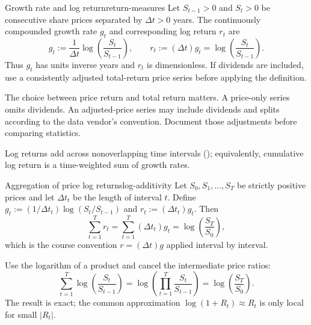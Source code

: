 \documentclass[11pt]{article}
\begin{document}
\begin{definition}{Growth rate and log return}{return-measures}
Let $S_{t-1}>0$ and $S_t>0$ be consecutive share prices separated by $\Delta t>0$ years. The continuously compounded growth rate $g_t$ and corresponding log return $r_t$ are
\begin{equation}
  \label{eq:return-measures}
  g_t:=\frac{1}{\Delta t}\log\!\left(\frac{S_t}{S_{t-1}}\right),
  \qquad
  r_t:=(\Delta t)g_t=\log\!\left(\frac{S_t}{S_{t-1}}\right).
\end{equation}
Thus $g_t$ has units inverse years and $r_t$ is dimensionless. If dividends are included, use a consistently adjusted total-return price series before applying the definition.
\end{definition}

The choice between price return and total return matters. A price-only series omits dividends. An adjusted-price series may include dividends and splits according to the data vendor's convention. Document those adjustments before comparing statistics.

Log returns add across nonoverlapping time intervals (); equivalently, cumulative log return is a time-weighted sum of growth rates.

\begin{proposition}{Aggregation of price log returns}{log-additivity}
Let $S_0,S_1,\ldots,S_T$ be strictly positive prices and let $\Delta t_t$ be the length of interval $t$. Define $g_t:=(1/\Delta t_t)\log(S_t/S_{t-1})$ and $r_t:=(\Delta t_t)g_t$. Then
\begin{equation}
  \label{eq:log-additivity}
  \sum_{t=1}^{T}r_t
  =\sum_{t=1}^{T}(\Delta t_t)g_t
  =\log\!\left(\frac{S_T}{S_0}\right),
\end{equation}
which is the course convention $r=(\Delta t)g$ applied interval by interval.
\end{proposition}

\begin{derivation}
Use the logarithm of a product and cancel the intermediate price ratios:
\begin{equation*}
  \sum_{t=1}^{T}\log\!\left(\frac{S_t}{S_{t-1}}\right)
  =\log\!\left(\prod_{t=1}^{T}\frac{S_t}{S_{t-1}}\right)
  =\log\!\left(\frac{S_T}{S_0}\right).
\end{equation*}
The result is exact; the common approximation $\log(1+R_t)\approx R_t$ is only local for small $\lvert R_t\rvert$.
\end{derivation}
\end{document}
